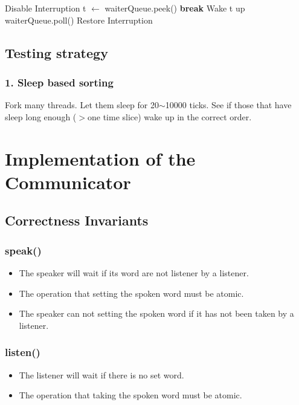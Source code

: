 \documentclass{article}
\newcommand{\Break}{\State \textbf{break} }
\begin{document}
	\begin{algorithm}[H]
		\begin{algorithmic}
			\State Disable Interruption
				\State t $\leftarrow$ waiterQueue.peek()
					\Break
				\EndIf
				\State Wake t up
				\State waiterQueue.poll()
			\EndWhile		
			\State Restore Interruption
			\EndProcedure
		\end{algorithmic}
	\end{algorithm}
	
	\subsection{Testing strategy}
	
	\subsubsection*{1. Sleep based sorting}
	Fork many threads. Let them sleep for 20$\sim$10000 ticks. See if those that have sleep long enough ($>$one time slice) wake up in the correct order.
%	
	\section{Implementation of the Communicator}
	
	\subsection{Correctness Invariants}
	
	\subsubsection*{speak()}
	\begin{itemize}
		\item The speaker will wait if its word are not listener by a listener.
		\item The operation that setting the spoken word must be atomic.
		\item The speaker can not setting the spoken word if it has not been taken by a listener.
	\end{itemize}
	
	\subsubsection*{listen()}
	\begin{itemize}
		\item The listener will wait if there is no set word.
		\item The operation that taking the spoken word must be atomic.
	\end{itemize}
	
\end{document}
